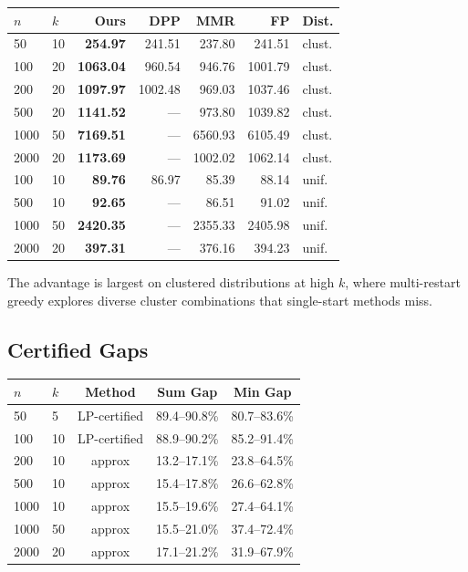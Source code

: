 \documentclass[11pt,a4paper]{article}
\begin{document}
\begin{center}
\begin{tabular}{llrrrrl}
\toprule
$n$ & $k$ & \textbf{Ours} & \textbf{DPP} & \textbf{MMR} & \textbf{FP} & \textbf{Dist.} \\
\midrule
50 & 10 & \textbf{254.97} & 241.51 & 237.80 & 241.51 & clust. \\
100 & 20 & \textbf{1063.04} & 960.54 & 946.76 & 1001.79 & clust. \\
200 & 20 & \textbf{1097.97} & 1002.48 & 969.03 & 1037.46 & clust. \\
500 & 20 & \textbf{1141.52} & --- & 973.80 & 1039.82 & clust. \\
1000 & 50 & \textbf{7169.51} & --- & 6560.93 & 6105.49 & clust. \\
2000 & 20 & \textbf{1173.69} & --- & 1002.02 & 1062.14 & clust. \\
\midrule
100 & 10 & \textbf{89.76} & 86.97 & 85.39 & 88.14 & unif. \\
500 & 10 & \textbf{92.65} & --- & 86.51 & 91.02 & unif. \\
1000 & 50 & \textbf{2420.35} & --- & 2355.33 & 2405.98 & unif. \\
2000 & 20 & \textbf{397.31} & --- & 376.16 & 394.23 & unif. \\
\bottomrule
\end{tabular}
\end{center}

The advantage is largest on clustered distributions at high $k$, where multi-restart greedy explores diverse cluster combinations that single-start methods miss.

\subsection{Certified Gaps}

\begin{center}
\begin{tabular}{llccc}
\toprule
$n$ & $k$ & \textbf{Method} & \textbf{Sum Gap} & \textbf{Min Gap} \\
\midrule
50 & 5 & LP-certified & 89.4--90.8\% & 80.7--83.6\% \\
100 & 10 & LP-certified & 88.9--90.2\% & 85.2--91.4\% \\
200 & 10 & approx & 13.2--17.1\% & 23.8--64.5\% \\
500 & 10 & approx & 15.4--17.8\% & 26.6--62.8\% \\
1000 & 10 & approx & 15.5--19.6\% & 27.4--64.1\% \\
1000 & 50 & approx & 15.5--21.0\% & 37.4--72.4\% \\
2000 & 20 & approx & 17.1--21.2\% & 31.9--67.9\% \\
\bottomrule
\end{tabular}
\end{center}
\end{document}
